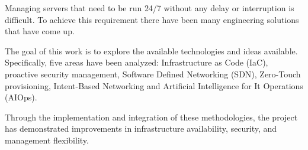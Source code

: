 
Managing servers that need to be run 24/7 without any delay or interruption is difficult. To achieve this requirement there have been many engineering solutions that have come up. 

The goal of this work is to explore the available technologies and ideas available. Specifically, five areas have been analyzed: Infrastructure as Code (IaC), proactive security management, Software Defined Networking (SDN), Zero-Touch provisioning, Intent-Based Networking and Artificial Intelligence for It Operations (AIOps).

Through the implementation and integration of these methodologies, the project has demonstrated improvements in infrastructure availability, security, and management flexibility.
